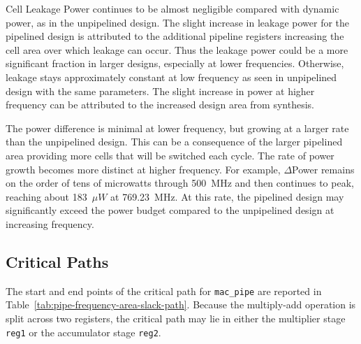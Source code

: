 \documentclass[a4paper,11pt]{article}
\begin{document}
Cell Leakage Power continues to be almost negligible compared with dynamic power, as in the unpipelined design. The slight increase in leakage power for the pipelined design is attributed to the additional pipeline registers increasing the cell area over which leakage can occur. Thus the leakage power could be a more significant fraction in larger designs, especially at lower frequencies. Otherwise, leakage stays approximately constant at low frequency as seen in unpipelined design with the same parameters. The slight increase in power at higher frequency can be attributed to the increased design area from synthesis.

The power difference is minimal at lower frequency, but growing at a larger rate than the unpipelined design. This can be a consequence of the larger pipelined area providing more cells that will be switched each cycle. The rate of power growth becomes more distinct at higher frequency. For example, $\Delta$Power remains on the order of tens of microwatts through 500~MHz and then continues to peak, reaching about 183~$\mu W$ at 769.23~MHz. At this rate, the pipelined design may significantly exceed the power budget compared to the unpipelined design at increasing frequency.




\subsection{Critical Paths}

The start and end points of the critical path for \texttt{mac\_pipe} are reported in Table~\ref{tab:pipe-frequency-area-slack-path}. Because the multiply-add operation is split across two registers, the critical path may lie in either the multiplier stage \texttt{reg1} or the accumulator stage \texttt{reg2}.
\end{document}
